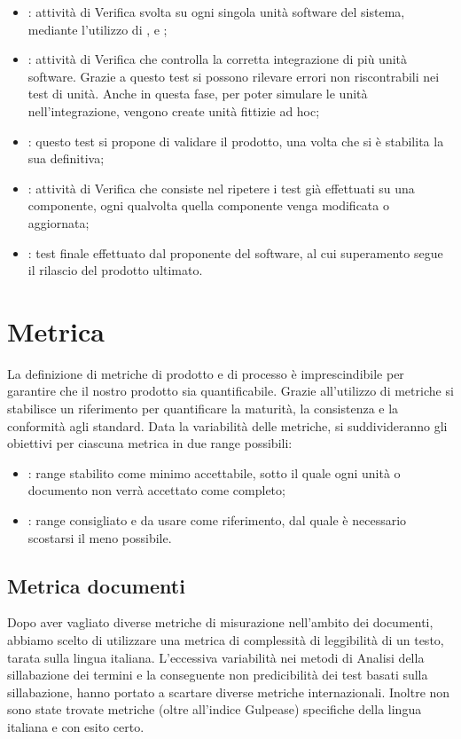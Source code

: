 \begin{itemize}
\item {}: attività di Verifica svolta su ogni singola unità software del sistema, mediante l'utilizzo di ,  e ;
\item {}: attività di Verifica che controlla la corretta integrazione di più unità software. Grazie a questo test si possono rilevare errori non riscontrabili nei test di unità. Anche in questa fase, per poter simulare le unità nell'integrazione, vengono create unità fittizie ad hoc;
\item {}: questo test si propone di validare il prodotto, una volta che si è stabilita  la sua  definitiva;
\item {}: attività di Verifica che consiste nel ripetere i test già effettuati su una componente, ogni qualvolta quella componente venga modificata o aggiornata;
\item {}: test finale effettuato dal proponente del software, al cui superamento segue il rilascio del prodotto ultimato.
\end{itemize}

\newpage
\section{Metrica}
\label{4.0}
La definizione di metriche di prodotto e di processo è imprescindibile per garantire che il nostro prodotto sia quantificabile. Grazie all'utilizzo di metriche si stabilisce un riferimento per quantificare la maturità, la consistenza e la conformità agli standard.
Data la variabilità delle metriche, si suddivideranno gli obiettivi per ciascuna metrica in due range possibili:
\begin{itemize}
\item {}: range stabilito come minimo accettabile, sotto il quale ogni unità o documento non verrà accettato come completo;
\item {}: range consigliato e da usare come riferimento, dal quale è necessario scostarsi il meno possibile.
\end{itemize}

\subsection{Metrica documenti}
\label{4.1}
Dopo aver vagliato diverse metriche di misurazione nell'ambito dei documenti, abbiamo scelto di utilizzare una metrica di complessità di leggibilità di un testo, tarata sulla lingua italiana. L'eccessiva variabilità nei metodi di Analisi della sillabazione dei termini e la conseguente non predicibilità dei test basati sulla sillabazione, hanno portato a scartare diverse metriche internazionali. Inoltre non sono state trovate metriche (oltre all'indice Gulpease) specifiche della lingua italiana e con esito certo.


